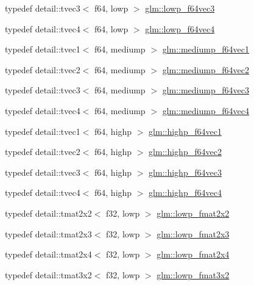 \begin{DoxyCompactItemize}
\item 
typedef detail\+::tvec3$<$ f64, lowp $>$ \hyperlink{group__gtc__type__precision_gad2d5e1436d926ae7201c860dce01a0fe}{glm\+::lowp\+\_\+f64vec3}
\item 
typedef detail\+::tvec4$<$ f64, lowp $>$ \hyperlink{group__gtc__type__precision_gaf99497c42a2d011fecab7f3f2312213d}{glm\+::lowp\+\_\+f64vec4}
\item 
typedef detail\+::tvec1$<$ f64, mediump $>$ \hyperlink{group__gtc__type__precision_ga1e3bbbd9ce5e215c4ba0980264b2711d}{glm\+::mediump\+\_\+f64vec1}
\item 
typedef detail\+::tvec2$<$ f64, mediump $>$ \hyperlink{group__gtc__type__precision_ga892891863b8e50195e3e48077a329335}{glm\+::mediump\+\_\+f64vec2}
\item 
typedef detail\+::tvec3$<$ f64, mediump $>$ \hyperlink{group__gtc__type__precision_gae2832f9acbf0cc1071fcf93336db6e0c}{glm\+::mediump\+\_\+f64vec3}
\item 
typedef detail\+::tvec4$<$ f64, mediump $>$ \hyperlink{group__gtc__type__precision_ga0e011facac062fd7fb9b40c7d8288310}{glm\+::mediump\+\_\+f64vec4}
\item 
typedef detail\+::tvec1$<$ f64, highp $>$ \hyperlink{group__gtc__type__precision_ga1054b4e4da2b907b35e1806bd6fbaef1}{glm\+::highp\+\_\+f64vec1}
\item 
typedef detail\+::tvec2$<$ f64, highp $>$ \hyperlink{group__gtc__type__precision_ga1efd4982eaeafae59ce40deb89e018e7}{glm\+::highp\+\_\+f64vec2}
\item 
typedef detail\+::tvec3$<$ f64, highp $>$ \hyperlink{group__gtc__type__precision_ga93cbac95bb9106fe15c987c0f56ae679}{glm\+::highp\+\_\+f64vec3}
\item 
typedef detail\+::tvec4$<$ f64, highp $>$ \hyperlink{group__gtc__type__precision_ga1e9d8145fb9521701a5eeb6df5754184}{glm\+::highp\+\_\+f64vec4}
\item 
typedef detail\+::tmat2x2$<$ f32, lowp $>$ \hyperlink{group__gtc__type__precision_ga99367a30c64035d7e7f76410105d10e3}{glm\+::lowp\+\_\+fmat2x2}
\item 
typedef detail\+::tmat2x3$<$ f32, lowp $>$ \hyperlink{group__gtc__type__precision_ga01c5c29a6cee22c3e75de25c98dbecc9}{glm\+::lowp\+\_\+fmat2x3}
\item 
typedef detail\+::tmat2x4$<$ f32, lowp $>$ \hyperlink{group__gtc__type__precision_ga14b4460b2132fd3db19b53ec6f9353f2}{glm\+::lowp\+\_\+fmat2x4}
\item 
typedef detail\+::tmat3x2$<$ f32, lowp $>$ \hyperlink{group__gtc__type__precision_ga6e03c9a11f7d781af7549ce566844cc6}{glm\+::lowp\+\_\+fmat3x2}

\end{DoxyCompactItemize}
